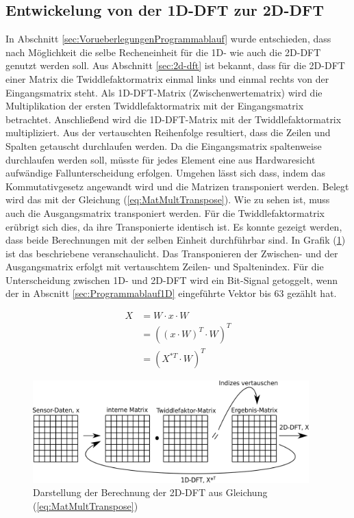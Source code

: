 \subsection{Entwickelung von der 1D-DFT zur 2D-DFT}
In Abschnitt \ref{sec:VorueberlegungenProgrammablauf} wurde entschieden, dass nach Möglichkeit die selbe Recheneinheit
für die 1D- wie auch die 2D-DFT genutzt werden soll. 
Aus Abschnitt \ref{sec:2d-dft} ist bekannt, dass für die 2D-DFT einer Matrix die Twiddlefaktormatrix einmal links und einmal rechts von der Eingangsmatrix steht.
Als 1D-DFT-Matrix (Zwischenwertematrix) wird die Multiplikation der ersten Twiddlefaktormatrix mit der Eingangsmatrix betrachtet. Anschließend wird die 1D-DFT-Matrix mit der 
Twiddlefaktormatrix multipliziert. Aus der vertauschten Reihenfolge resultiert, dass die Zeilen und Spalten getauscht durchlaufen werden. 
Da die Eingangsmatrix spaltenweise durchlaufen werden soll, müsste  für jedes Element eine aus Hardwaresicht aufwändige Fallunterscheidung erfolgen.
Umgehen lässt sich dass, indem das Kommutativgesetz angewandt wird und die Matrizen transponiert werden. Belegt wird das mit der Gleichung (\ref{eq:MatMultTranspose}). Wie zu sehen ist, muss auch die Ausgangsmatrix transponiert werden. Für die Twiddlefaktormatrix erübrigt sich dies, da ihre Transponierte identisch ist.
Es konnte gezeigt werden, dass beide Berechnungen mit der selben Einheit durchführbar sind. In Grafik (\ref{pic:MatMultTranspose}) ist das beschriebene veranschaulicht.
Das Transponieren der Zwischen- und der Ausgangsmatrix erfolgt mit vertauschtem Zeilen- und Spaltenindex. 
Für die Unterscheidung zwischen 1D- und 2D-DFT wird ein Bit-Signal getoggelt, wenn der in Abscnitt \ref{sec:Programmablauf1D} eingeführte Vektor bis 63 gezählt hat.

\begin{align}
 X &= W \cdot x \cdot W \nonumber \\
   &= \left(\left(x\cdot W\right)^T\cdot W\right)^T \label{eq:MatMultTranspose}\\
   &= \left(X^{*T} \cdot W\right)^T \nonumber
\end{align}


\begin{figure}[htbp]
 \centering
 \includegraphics[width=0.95\textwidth]{img/MatMultTranspose2.png}
 \caption{Darstellung der Berechnung der 2D-DFT aus Gleichung (\ref{eq:MatMultTranspose})}
 \label{pic:MatMultTranspose}
\end{figure}




